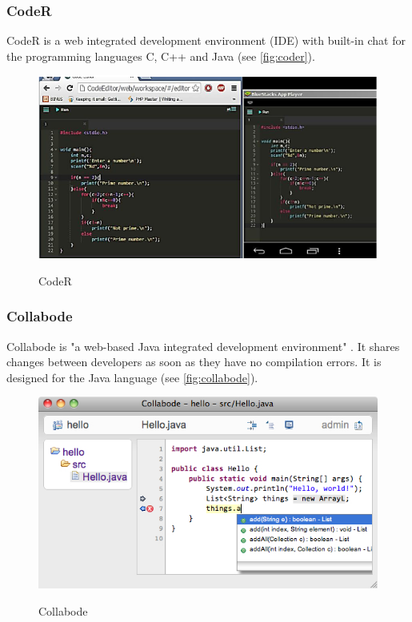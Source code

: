 \subsubsection{CodeR}
CodeR \cite{KurniawanSoesantoWijaya:2015:CodeR:Real-timeCodeEditorApplicationforCollaborativeProgramming} is a web integrated development environment (IDE) with built-in chat for the programming languages C, C++ and Java (see \autoref{fig:coder}).
\begin{figure}[hb]
    \centering
    \includegraphics[width=1\linewidth]{figures/screenshots/CodeR.png}
	\caption{CodeR }
	\cite{KurniawanSoesantoWijaya:2015:CodeR:Real-timeCodeEditorApplicationforCollaborativeProgramming}
    \label{fig:coder}
\end{figure}

\subsubsection{Collabode}
Collabode is "a web-based Java integrated development environment" \cite{Goldman:2011:RCC:2047196.2047215}. It shares changes between developers as soon as they have no compilation errors. It is designed for the Java language (see \autoref{fig:collabode}).
\begin{figure}[h]
    \centering
    \includegraphics[width=1\linewidth]{figures/screenshots/collabode.jpg}
	\caption{Collabode}
	\cite{Goldman:2011:RCC:2047196.2047215}
    \label{fig:collabode}
\end{figure}

